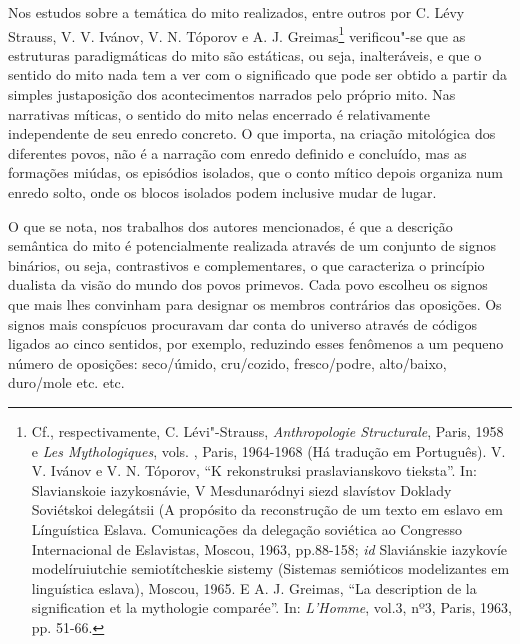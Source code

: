 Nos estudos sobre a temática do mito realizados, entre outros por C.
Lévy Strauss, V. V. Ivánov, V. N. Tóporov e A. J. Greimas\footnote{Cf.,
  respectivamente, C. Lévi"-Strauss, \emph{Anthropologie Structurale}, Paris,
  1958 e \emph{Les Mythologiques}, vols. , Paris, 1964-1968 (Há tradução
  em Português). V. V. Ivánov e V. N. Tóporov, ``K rekonstruksi
  praslavianskovo tieksta''. In: Slavianskoie iazykosnávie, V
  Mesdunaródnyi siezd slavístov Doklady Soviétskoi delegátsii (A
  propósito da reconstrução de um texto em eslavo em Línguística Eslava.
  Comunicações da delegação soviética ao  Congresso Internacional de
  Eslavistas, Moscou, 1963, pp.88-158; \emph{id} Slaviánskie iazykovíe
  modelíruiutchie semiotítcheskie sistemy (Sistemas semióticos
  modelizantes em linguística eslava), Moscou, 1965. E A. J. Greimas,
  ``La description de la signification et la mythologie
  comparée''. In: \emph{L'Homme}, vol.3, nº3, Paris, 1963, pp. 51-66.}
verificou"-se que as estruturas paradigmáticas do mito são estáticas, ou
seja, inalteráveis, e que o sentido do mito nada tem a ver com o
significado que pode ser obtido a partir da simples justaposição dos
acontecimentos narrados pelo próprio mito. Nas narrativas míticas, o
sentido do mito nelas encerrado é relativamente independente de seu
enredo concreto. O que importa, na criação mitológica dos diferentes
povos, não é a narração com enredo definido e concluído, mas as
formações miúdas, os episódios isolados, que o conto mítico depois
organiza num enredo solto, onde os blocos isolados podem inclusive mudar
de lugar.

O que se nota, nos trabalhos dos autores mencionados, é que a
descrição semântica do mito é potencialmente realizada através de um
conjunto de signos binários, ou seja, contrastivos e complementares,
o que caracteriza o princípio dualista da visão do mundo dos povos
primevos. Cada povo escolheu os signos que mais lhes convinham para
designar os membros contrários das oposições. Os signos mais conspícuos
procuravam dar conta do universo através de códigos ligados ao cinco
sentidos, por exemplo, reduzindo esses fenômenos a um pequeno número de
oposições: seco/úmido, cru/cozido, fresco/podre, alto/baixo, duro/mole
etc. etc.

